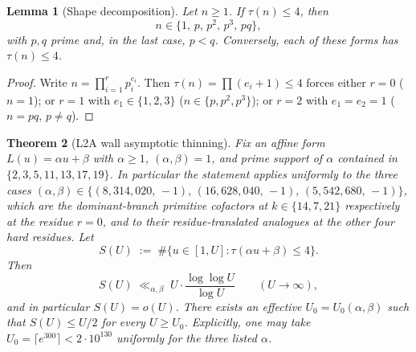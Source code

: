 \documentclass[11pt]{article}
\renewcommand{\_}{\origunderscore\allowbreak}
\newtheorem{theorem}{Theorem}[section]
\newtheorem{lemma}[theorem]{Lemma}
\theoremstyle{definition}
\theoremstyle{remark}
\begin{document}

\begin{lemma}[Shape decomposition]\label{lem:shape_decomp}
Let $n\ge 1$.  If $\tau(n)\le 4$, then
\[
  n\in\{1,\,p,\,p^{2},\,p^{3},\,pq\},
\]
with $p,q$ prime and, in the last case, $p<q$.  Conversely, each of
these forms has $\tau(n)\le 4$.
\end{lemma}

\begin{proof}
Write $n=\prod_{i=1}^{r}p_{i}^{e_{i}}$.  Then
$\tau(n)=\prod(e_{i}+1)\le 4$ forces either $r=0$
($n=1$); or $r=1$ with $e_{1}\in\{1,2,3\}$ ($n\in\{p,p^{2},p^{3}\}$);
or $r=2$ with $e_{1}=e_{2}=1$ ($n=pq$, $p\ne q$).
\end{proof}

\begin{theorem}[L2A wall asymptotic thinning]\label{thm:l2a}
Fix an affine form $L(u)=\alpha u+\beta$ with $\alpha\ge 1$,
$(\alpha,\beta)=1$, and prime support of $\alpha$ contained in
$\{2,3,5,11,13,17,19\}$.  In particular the statement applies uniformly
to the three cases
$(\alpha,\beta)\in\{(8{,}314{,}020,\,-1),\,(16{,}628{,}040,\,-1),\,(5{,}542{,}680,\,-1)\}$,
which are the dominant-branch primitive cofactors at $k\in\{14,7,21\}$
respectively at the residue $r=0$, and to their residue-translated
analogues at the other four hard residues.  Let
\[
  S(U)\;:=\;\#\{u\in[1,U]:\tau(\alpha u+\beta)\le 4\}.
\]
Then
\[
  S(U)\;\ll_{\alpha,\beta}\;U\cdot\frac{\log\log U}{\log U}
  \qquad(U\to\infty),
\]
and in particular $S(U)=o(U)$.  There exists an effective
$U_{0}=U_{0}(\alpha,\beta)$ such that $S(U)\le U/2$ for every
$U\ge U_{0}$.  Explicitly, one may take $U_{0}=\lceil e^{300}\rceil
<2\cdot 10^{130}$ uniformly for the three listed $\alpha$.
\end{theorem}
\end{document}

